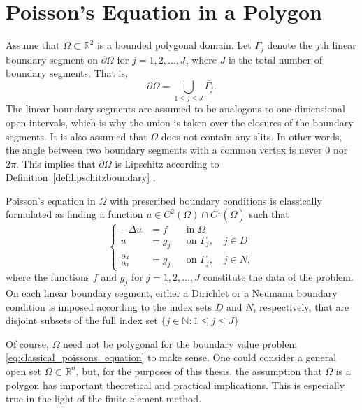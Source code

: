 \documentclass[english, 12pt, a4paper, sci, utf8, a-2b, online]{aaltothesis}
\theoremstyle{definition}
\theoremstyle{plain}
\numberwithin{equation}{section}
\begin{document}
\clearpage

\section{Poisson's Equation in a Polygon}
\label{sec:poissons_equation_in_a_polygon}

Assume that $\Omega \subset \mathbb{R}^2$ is a bounded polygonal domain.
Let $\Gamma_j$ denote the $j$th linear boundary segment on $\partial \Omega$
for $j = 1,2,\dotsc,J$, where $J$ is the total number of boundary segments.
That is,
\begin{equation*}
    \partial \Omega = \bigcup_{1 \leq j \leq J} \overline{\Gamma_j}.
\end{equation*}
The linear boundary segments are assumed to be analogous to one-dimensional
open intervals, which is why the union is taken over the closures of the
boundary segments.
It is also assumed that $\Omega$ does not contain any slits.
In other words, the angle between two boundary segments with a common vertex
is never $0$ nor $2\pi$.
This implies that $\partial \Omega$ is Lipschitz according to
Definition~\ref{def:lipschitzboundary} \cite{grisvard2011}.

Poisson's equation in $\Omega$ with prescribed boundary conditions
is classically formulated as finding a function
$u \in C^2(\Omega) \cap C^1(\overline{\Omega})$ such that
\begin{equation}
    \label{eq:classical_poissons_equation}
    \left\{
        \begin{aligned}
            -\Delta u &= f && \text{in } \Omega \\
            u &= g_j && \text{on } \Gamma_j, \quad j \in D \\
            \frac{\partial u}{\partial n} &= g_j && \text{on } \Gamma_j,
            \quad j \in N,
        \end{aligned}
    \right.
\end{equation}
where the functions $f$ and $g_j$ for $j=1,2,\dotsc,J$ constitute the data
of the problem. On each linear boundary segment, either a Dirichlet or a Neumann
boundary condition is imposed according to the index sets $D$ and $N$, respectively,
that are disjoint subsets of the full index set
$\{ j \in \mathbb{N} : 1 \leq j \leq J \}$.

Of course, $\Omega$ need not be polygonal for the boundary value problem
\eqref{eq:classical_poissons_equation} to make sense. One could consider
a general open set $\Omega \subset \mathbb{R}^n$, but, for the purposes of
this thesis, the assumption that $\Omega$ is a polygon has important theoretical
and practical implications. This is especially true in the light of
the finite element method.
\end{document}
